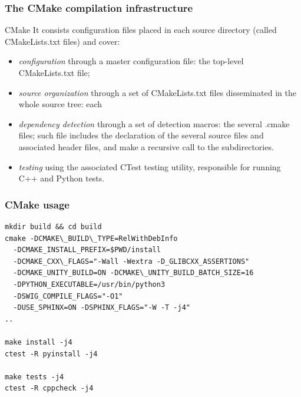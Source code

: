 \documentclass[8pt]{beamer}
\begin{document}
\begin{frame}
  \frametitle{The CMake compilation infrastructure}
  \begin{block}{CMake}
    It consists configuration files placed in each source directory (called CMakeLists.txt files) and cover:
    \begin{itemize}
    \item \emph{configuration} through a master configuration file: the top-level CMakeLists.txt file;
    \item \emph{source organization} through a set of CMakeLists.txt files disseminated in the whole source tree: each
    \item \emph{dependency detection} through a set of detection macros: the several .cmake files;
        such file includes the declaration of the several source files and associated header files, and make a recursive call to the subdirectories.
    \item \emph{testing} using the associated CTest testing utility, responsible for running C++ and Python tests.
    \end{itemize}
  \end{block}
\end{frame}

\begin{frame}[fragile]
  \frametitle{CMake usage}

  \lstset{style=mystyle}
  
\begin{lstlisting}
mkdir build && cd build
cmake -DCMAKE\_BUILD\_TYPE=RelWithDebInfo
  -DCMAKE_INSTALL_PREFIX=$PWD/install
  -DCMAKE_CXX\_FLAGS="-Wall -Wextra -D_GLIBCXX_ASSERTIONS"
  -DCMAKE_UNITY_BUILD=ON -DCMAKE\_UNITY_BUILD_BATCH_SIZE=16
  -DPYTHON_EXECUTABLE=/usr/bin/python3
  -DSWIG_COMPILE_FLAGS="-O1"
  -DUSE_SPHINX=ON -DSPHINX_FLAGS="-W -T -j4"
..

make install -j4
ctest -R pyinstall -j4

make tests -j4
ctest -R cppcheck -j4
\end{lstlisting}

\end{frame}

\end{document}
